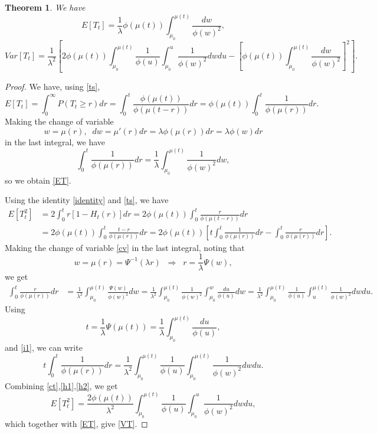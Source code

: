 \documentclass{article}
\newtheorem{thm}{Theorem}[section]
\numberwithin{equation}{section}
\begin{document}
\begin{thm}\label{evT} We have
\begin{equation}\label{ET}E[T_t]=\frac{1}{\lambda}\phi(\mu(t))\int_{\mu_0}^{\mu(t)}\frac{dw}{\phi(w)^2},\end{equation}
\begin{equation}\label{VT}
	Var[T_t]=\frac{1}{\lambda^2}\left[2\phi(\mu(t))\int_{\mu_0}^{\mu(t)}\frac{1}{\phi(u)}\int_{\mu_0}^{u}\frac{1}{\phi(w)^2}dwdu-\left[\phi(\mu(t))\int_{\mu_0}^{\mu(t)}\frac{dw}{\phi(w)^2}\right]^2\right].
\end{equation}
\end{thm}
\begin{proof}
We have, using \eqref{ts},
$$E[T_t]=\int_0^\infty P(T_t\geq r)dr= \int_0^t\frac{\phi(\mu(t))}{\phi(\mu(t-r))}dr
=\phi(\mu(t))\int_0^t\frac{1}{\phi(\mu(r))}dr.$$
Making the change of variable
\begin{equation}\label{cv}w=\mu(r),\;\; dw=\mu'(r)dr=\lambda \phi(\mu(r))dr=\lambda \phi(w)dr\end{equation}
in the last integral, we have
\begin{equation}\label{i1}
	\int_0^t\frac{1}{\phi(\mu(r))}dr=\frac{1}{\lambda}\int_{\mu_0}^{\mu(t)}\frac{1}{\phi(w)^2}dw,
\end{equation}
so we obtain
\eqref{ET}.

Using the identity \eqref{identity} and \eqref{ts}, we have
\begin{align}\label{ct}
	E[T_t^2]&=2\int_0^t r[1-H_t(r)]dr=2\phi(\mu(t))\int_0^t \frac{r}{\phi(\mu(t-r))}dr\\
	&=2\phi(\mu(t))\int_0^t \frac{t-r}{\phi(\mu(r))}dr=2\phi(\mu(t))\left[t\int_0^t \frac{1}{\phi(\mu(r))}dr-\int_0^t \frac{r}{\phi(\mu(r))}dr\right].\nonumber
\end{align}
Making the change of variable \eqref{cv} in the last integral, noting that
$$w=\mu(r)=\Psi^{-1}(\lambda r)\;\;\Rightarrow\;\;r=\frac{1}{\lambda}\Psi(w),$$
we get
\begin{align}\label{h1}\int_0^t \frac{r}{\phi(\mu(r))}dr&=\frac{1}{\lambda^2 }\int_{\mu_0}^{\mu(t)} \frac{\Psi(w)}{\phi(w)^2}dw=
	\frac{1}{\lambda^2}\int_{\mu_0}^{\mu(t)} \frac{1}{\phi(w)^2}\int_{\mu_0}^w \frac{du}{\phi(u)}dw
	=\frac{1}{\lambda^2}\int_{\mu_0}^{\mu(t)} \frac{1}{\phi(u)}\int_{u}^{\mu(t)}\frac{1}{\phi(w)^2} dwdu.\end{align}
Using
$$t=\frac{1}{\lambda}\Psi(\mu(t))=\frac{1}{\lambda}\int_{\mu_0}^{\mu(t)}\frac{du}{\phi(u)},$$
and \eqref{i1}, we can write
\begin{equation}\label{h2}
	t\int_0^t \frac{1}{\phi(\mu(r))}dr=\frac{1}{\lambda^2}\int_{\mu_0}^{\mu(t)}\frac{1}{\phi(u)}\int_{\mu_0}^{\mu(t)}\frac{1}{\phi(w)^2}dwdu.
\end{equation}
Combining \eqref{ct},\eqref{h1},\eqref{h2}, we get
$$E[T_t^2]=\frac{2\phi(\mu(t))}{\lambda^2}\int_{\mu_0}^{\mu(t)}\frac{1}{\phi(u)}\int_{\mu_0}^{u}\frac{1}{\phi(w)^2}dwdu,$$
which together with \eqref{ET}, give \eqref{VT}.
\end{proof}
\end{document}
